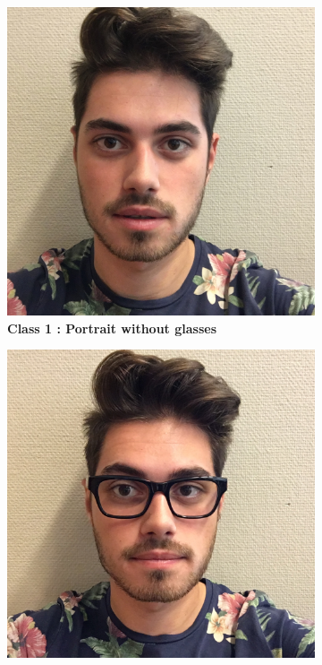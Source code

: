 \begin{figure}[!hp]
\centering
	\begin{subfigure}[h]{0.45\textwidth}
    \centering
	\includegraphics[height=0.12\textheight]{dataset/IMG_0992.jpg}
	\caption{\bf Class 1 : Portrait without glasses}
	\label{fig:figure1_1}
	\end{subfigure}
    \begin{subfigure}[h]{0.45\textwidth}
    \centering
    \includegraphics[height=0.12\textheight]{dataset/IMG_1077.jpg}

\end{subfigure}
\end{figure}
